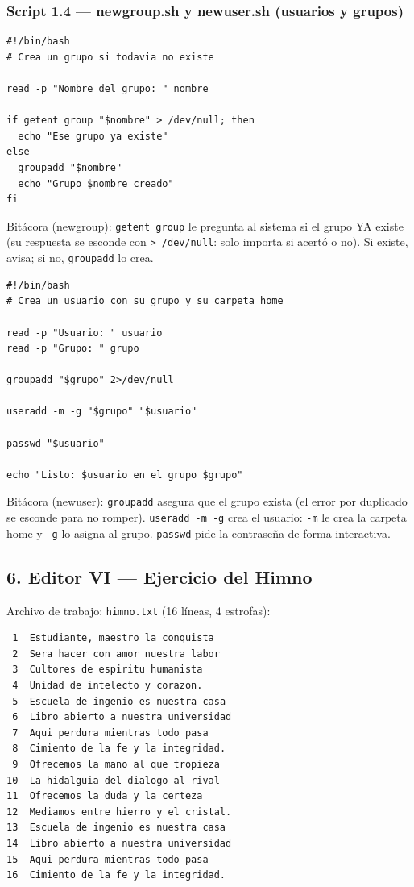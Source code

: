 \subsubsection{Script 1.4 --- newgroup.sh y newuser.sh (usuarios y grupos)}

\begin{lstlisting}
#!/bin/bash
# Crea un grupo si todavia no existe

read -p "Nombre del grupo: " nombre

if getent group "$nombre" > /dev/null; then
  echo "Ese grupo ya existe"
else
  groupadd "$nombre"
  echo "Grupo $nombre creado"
fi
\end{lstlisting}

Bitácora (newgroup): \texttt{getent group} le pregunta al sistema si el grupo YA existe (su respuesta se esconde con \texttt{> /dev/null}: solo importa si acertó o no). Si existe, avisa; si no, \texttt{groupadd} lo crea.

\begin{lstlisting}
#!/bin/bash
# Crea un usuario con su grupo y su carpeta home

read -p "Usuario: " usuario
read -p "Grupo: " grupo

groupadd "$grupo" 2>/dev/null

useradd -m -g "$grupo" "$usuario"

passwd "$usuario"

echo "Listo: $usuario en el grupo $grupo"
\end{lstlisting}

Bitácora (newuser): \texttt{groupadd} asegura que el grupo exista (el error por duplicado se esconde para no romper). \texttt{useradd -m -g} crea el usuario: \texttt{-m} le crea la carpeta home y \texttt{-g} lo asigna al grupo. \texttt{passwd} pide la contraseña de forma interactiva.

\subsection{6. Editor VI --- Ejercicio del Himno}

Archivo de trabajo: \texttt{himno.txt} (16 líneas, 4 estrofas):

\begin{lstlisting}
 1  Estudiante, maestro la conquista
 2  Sera hacer con amor nuestra labor
 3  Cultores de espiritu humanista
 4  Unidad de intelecto y corazon.
 5  Escuela de ingenio es nuestra casa
 6  Libro abierto a nuestra universidad
 7  Aqui perdura mientras todo pasa
 8  Cimiento de la fe y la integridad.
 9  Ofrecemos la mano al que tropieza
10  La hidalguia del dialogo al rival
11  Ofrecemos la duda y la certeza
12  Mediamos entre hierro y el cristal.
13  Escuela de ingenio es nuestra casa
14  Libro abierto a nuestra universidad
15  Aqui perdura mientras todo pasa
16  Cimiento de la fe y la integridad.
\end{lstlisting}

